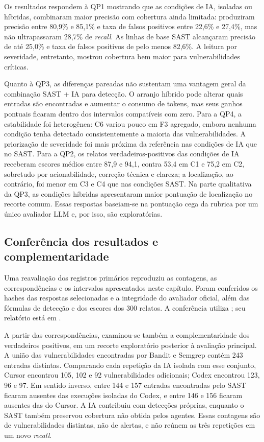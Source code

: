 Os resultados respondem à QP1 mostrando que as condições de IA, isoladas ou híbridas,
combinaram maior precisão com cobertura ainda limitada: produziram precisão entre 80,9\% e 85,1\%
e taxa de falsos positivos entre 22,6\% e 27,4\%, mas não ultrapassaram 28,7\%
de \textit{recall}. As linhas de base SAST alcançaram precisão de até 25,0\%
e taxa de falsos positivos de pelo menos 82,6\%. A leitura por severidade, entretanto,
mostrou cobertura bem maior para vulnerabilidades críticas.

Quanto à QP3, as diferenças pareadas não sustentam uma vantagem geral da combinação
SAST + IA para detecção. O arranjo híbrido pode alterar quais entradas são
encontradas e aumentar o consumo de tokens, mas seus ganhos pontuais ficaram
dentro dos intervalos compatíveis com zero. Para a QP4, a estabilidade foi
heterogênea: C6 variou pouco em F3 agregado, embora nenhuma condição tenha
detectado consistentemente a maioria das vulnerabilidades. A priorização de
severidade foi mais próxima da referência nas condições de IA que no SAST.
Para a QP2, os relatos verdadeiros-positivos das condições de IA receberam
escores médios entre 87,9 e 94,1, contra 53,4 em C1 e 75,2 em C2, sobretudo por
acionabilidade, correção técnica e clareza; a localização, ao contrário, foi
menor em C3 e C4 que nas condições SAST. Na parte qualitativa da QP3, as
condições híbridas apresentaram maior pontuação de localização no recorte comum. Essas respostas
baseiam-se na pontuação cega da rubrica por um único avaliador LLM e, por isso,
são exploratórias.

\subsection{Conferência dos resultados e complementaridade}\label{subsec:auditoria-resultados}

Uma reavaliação dos registros primários reproduziu as contagens, as
correspondências e os intervalos apresentados neste capítulo. Foram
conferidos os hashes das respostas selecionadas e a integridade do avaliador
oficial, além das fórmulas de detecção e dos escores dos 300 relatos.
A conferência utiliza ; seu relatório
está em .

A partir das correspondências, examinou-se também a complementaridade dos
verdadeiros positivos, em um recorte exploratório posterior à avaliação
principal. A união das vulnerabilidades encontradas por Bandit e Semgrep
contém 243 entradas distintas. Comparando cada repetição da IA isolada com
esse conjunto, Cursor encontrou 105, 102 e 92 vulnerabilidades adicionais;
Codex encontrou 123, 96 e 97. Em sentido inverso, entre 144 e 157 entradas
encontradas pelo SAST ficaram ausentes das execuções isoladas do Codex,
e entre 146 e 156 ficaram ausentes das do Cursor. A IA contribuiu com
detecções próprias, enquanto o SAST também preservou cobertura não obtida
pelos agentes. Essas contagens são de vulnerabilidades distintas, não de
alertas, e não reúnem as três repetições em um novo \textit{recall}.

